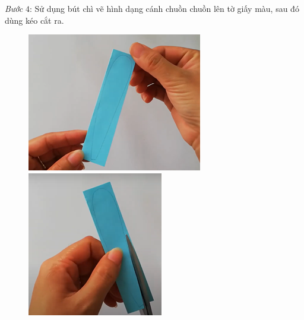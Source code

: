 \begin{multicols}{2}
\begin{figure}[H]
		\vspace*{-10pt}
	\end{figure}
	\textit{Bước} $4$: Sử dụng bút chì vẽ hình dạng cánh chuồn chuồn lên tờ giấy màu, sau đó dùng kéo cắt ra.
	\begin{figure}[H]
		\vspace*{-5pt}
		\centering
		\captionsetup{labelformat= empty, justification=centering}
		\includegraphics[width= 1\linewidth]{69}
		\includegraphics[width= 1\linewidth]{70}

\end{figure}
\end{multicols}
